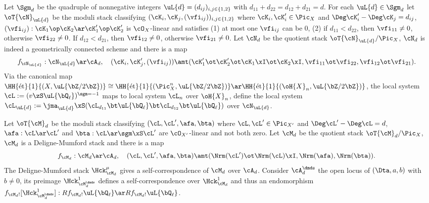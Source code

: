 \documentclass[a4paper, twoside]{article}
\begin{document}
\begin{stp}
	 Let $\Sgm_{d}$ be the quadruple of nonnegative integers $\uL{d}=(d_{ij})_{i,j\in\{1,2\}}$ with $d_{11}+d_{22}=d_{12}+d_{21}=d$. For each $\uL{d}\in\Sgm_{d}$ let $\oT{\cN}_{\uL{d}}$ be the moduli stack classifying $(\cK_{i},\cK_{j},(\vfi_{ij}))_{i,j\in\{1,2\}}$ where $\cK_{i},\cK_{i}'\in\Pic_{X}$ and $\Deg\cK_{i}'-\Deg\cK_{j}=d_{ij}$, $(\vfi_{ij}):\cK_{1}\op\cK_{2}\ar\cK_{1}'\op\cK_{2}'$ is $\cO_{X}$-linear and satisfies (1) at most one $\vfi_{ij}$ can be $0$, (2) if $d_{11}<d_{22}$, then $\vfi_{11}\neq0$, otherwise $\vfi_{22}\neq0$. If $d_{12}<d_{21}$, then $\vfi_{12}\neq0$, otherwise $\vfi_{21}\neq0$. Let $\cN_{d}$ be the quotient stack $\oT{\cN}_{\uL{d}}/\Pic_{X}$, $\cN_{d}$ is indeed a geometrically connected scheme and there is a map
	\[
		f_{\cN_{\uL{d}}}:\cN_{\uL{d}}\ar\cA_{d},\quad (\cK_{i},\cK_{j}',(\vfi_{ij}))\amt(\cK_{1}'\ot\cK_{2}'\ot\cK_{1}\xI\ot\cK_{2}\xI,\vfi_{11}\ot\vfi_{22},\vfi_{12}\ot\vfi_{21}).
	\]
	Via the canonical map $\HH{\text{{\'e}t}}{1}{(X,\uL{\bZ/2\bZ})}\cong\HH{\text{{\'e}t}}{1}{(\Pic_{X}^{n},\uL{\bZ/2\bZ})}\ar\HH{\text{{\'e}t}}{1}{(\oH{X}_{n},\uL{\bZ/2\bZ})}$, the local system $\cL:=(v\zS\uL{\bQ_{\ell}})^{\sgm=-1}$ maps to local system $\cL_{n}$ over $\oH{X}_{n}$, define the local system $\cL_{\uL{d}}:=\jma_{\uL{d}}\xS(\cL_{d_{11}}\bt\uL{\bQ_{\ell}}\bt\cL_{d_{12}}\bt\uL{\bQ_{\ell}})$ over $\cN_{\uL{d}}$.

	 Let $\oT{\cM}_{d}$ be the moduli stack classifying $(\cL,\cL',\afa,\bta)$ where $\cL,\cL'\in\Pic_{X'}$ and $\Deg\cL'-\Deg\cL=d$, $\afa:\cL\ar\cL'$ and $\bta:\cL\ar\sgm\xS\cL'$ are $\cO_{X'}$-linear and not both zero. Let $\cM_{d}$ be the quotient stack $\oT{\cM}_{d}/\Pic_{X}$, $\cM_{d}$ is a Deligne-Mumford stack and there is a map
	\[
		f_{\cM_{d}}:\cM_{d}\ar\cA_{d},\quad (\cL,\cL',\afa,\bta)\amt(\Nrm(\cL')\ot\Nrm(\cL)\xI,\Nrm(\afa),\Nrm(\bta)).
	\]
	The Deligne-Mumford stack $\Hck_{\cM_{d}}^{\mu}$ gives a self-correspondence of $\cM_{d}$ over $\cA_{d}$. Consider $\cA_{d}^{\dmds}$ the open locus of $(\Dta,a,b)$ with $b\neq0$, its preimage $\Hck_{\cM_{d}^{\dmds}}^{1}$ defines a self-correspondence over $\Hck_{\cM_{d}}^{1}$ and thus an endomorphism $f_{\cM_{d}!}[\Hck_{\cM_{d}^{\dmds}}^{1}]:Rf_{\cM_{d}!}\uL{\bQ_{\ell}}\ar Rf_{\cM_{d}!}\uL{\bQ_{\ell}}$.
\end{stp}
\end{document}
